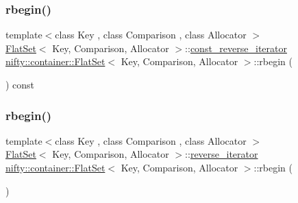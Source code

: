 \mbox{\label{classnifty_1_1container_1_1FlatSet_a612b58eb7cf9c93424ead2af4ec1b8be}} 
\subsubsection{\texorpdfstring{rbegin()}{rbegin()}\hspace{0.1cm}{\footnotesize\ttfamily [1/2]}}
{\footnotesize\ttfamily template$<$class Key , class Comparison , class Allocator $>$ \\
\hyperlink{classnifty_1_1container_1_1FlatSet}{Flat\+Set}$<$ Key, Comparison, Allocator $>$\+::\hyperlink{classnifty_1_1container_1_1FlatSet_ab7858d2e6eeeb311e21988d9b4a5b802}{const\+\_\+reverse\+\_\+iterator} \hyperlink{classnifty_1_1container_1_1FlatSet}{nifty\+::container\+::\+Flat\+Set}$<$ Key, Comparison, Allocator $>$\+::rbegin (\begin{DoxyParamCaption}{ }\end{DoxyParamCaption}) const\hspace{0.3cm}{\ttfamily [inline]}}

\mbox{\label{classnifty_1_1container_1_1FlatSet_a82523673d9285f43e73e90b37b00d105}} 
\subsubsection{\texorpdfstring{rbegin()}{rbegin()}\hspace{0.1cm}{\footnotesize\ttfamily [2/2]}}
{\footnotesize\ttfamily template$<$class Key , class Comparison , class Allocator $>$ \\
\hyperlink{classnifty_1_1container_1_1FlatSet}{Flat\+Set}$<$ Key, Comparison, Allocator $>$\+::\hyperlink{classnifty_1_1container_1_1FlatSet_a5ad537835e3b8911ac1beed1a95d3ac2}{reverse\+\_\+iterator} \hyperlink{classnifty_1_1container_1_1FlatSet}{nifty\+::container\+::\+Flat\+Set}$<$ Key, Comparison, Allocator $>$\+::rbegin (\begin{DoxyParamCaption}{ }\end{DoxyParamCaption})\hspace{0.3cm}{\ttfamily [inline]}}


